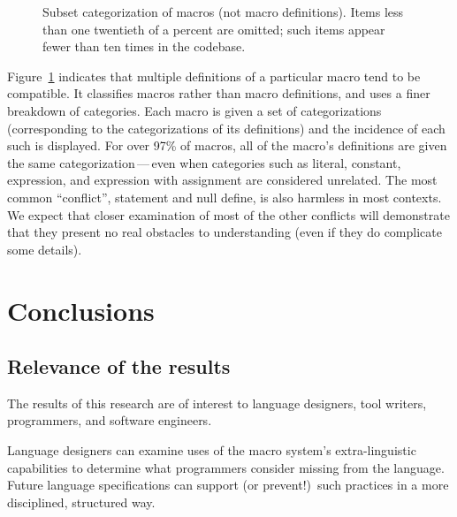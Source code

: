\documentclass[11pt]{article}
\begin{document}
\begin{figure}
{\small\centerline{}}
\caption{Subset categorization of macros (not macro definitions).   Items
  less than one twentieth of a percent are omitted; such items appear
  fewer than ten times in the codebase.}
\label{fig:subset-categories}
\end{figure}
 
Figure~\ref{fig:subset-categories} indicates that multiple definitions of a
particular macro tend to be compatible.  It classifies macros rather than
macro definitions, and uses a finer breakdown of categories.  Each macro is
given a set of categorizations (corresponding to the categorizations of its
definitions) and the incidence of each such is displayed.  For over 97\% of
macros, all of the macro's definitions are given the same
categorization\,---\,even when categories such as literal, constant,
expression, and expression with assignment are considered unrelated.  The
most common ``conflict'', statement and null define, is also harmless in
most contexts.  We expect that closer examination of most of the other
conflicts will demonstrate that they present no real obstacles to
understanding (even if they do complicate some details).


\section{Conclusions}
\label{sec:conclusion}

\subsection{Relevance of the results}

The results of this research are of interest to language designers, tool
writers, programmers, and software engineers.

Language designers can examine uses of the macro system's extra-linguistic
capabilities to determine what programmers consider missing from the
language.  Future language specifications can support (or prevent!)\ such
practices in a more disciplined, structured way.

\end{document}
